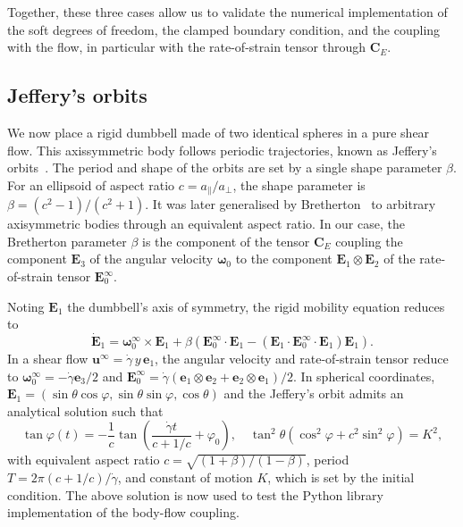\documentclass[aps,prfluids,groupedaddress]{revtex4-2}
\newcommand{\be}{\bm{e}}
\newcommand{\bu}{\bm{u}}
\newcommand{\bomega}{\bm{\omega}}
\newcommand{\bE}{\bm{E}}
\newcommand{\tC}{\bm{{C}}}
\newcommand{\tE}{\bm{{E}}}
\newcommand{\bEd}{\bm{{\dot E}}}
\begin{document}
Together, these three cases allow us to validate the numerical implementation of the soft degrees of freedom, the clamped boundary condition, and the coupling with the flow, in particular with the rate-of-strain tensor through $\tC_E$.

\subsection{Jeffery's orbits}

We now place a rigid dumbbell made of two identical spheres in a pure shear flow. 
This axissymmetric body follows periodic trajectories, known as Jeffery's orbits~\cite{Jeffery1922, Bretherton1962, Thorp2019, Ishimoto2023}. 
The period and shape of the orbits are set by a single shape parameter $\beta$. 
For an ellipsoid of aspect ratio $c=a_\parallel / a_\perp$, the shape parameter is $\beta = (c^2 - 1) / (c^2 + 1)$. 
It was later generalised by Bretherton~\cite{Bretherton1962} to arbitrary axisymmetric bodies through an equivalent aspect ratio.
In our case, the Bretherton parameter $\beta$ is the component of the tensor $\tC_E$ coupling the component $\bE_3$ of the angular velocity $\bomega_0$ to the component $\bE_1 \otimes \bE_2$ of the rate-of-strain tensor $\tE_0^\infty$. 

Noting $\bE_1$ the dumbbell's axis of symmetry, the rigid mobility equation reduces to
\begin{equation}
\bEd_1 = \bomega_0^\infty \times \bE_{1} +
	\beta\left(\tE_0^\infty\cdot\bE_{1} - (\bE_{1}\cdot\tE_0^\infty\cdot\bE_{1})\bE_{1}\right).
\end{equation}
In a shear flow $\bu^\infty = \dot\gamma\,y\,\be_1$, the angular velocity and rate-of-strain tensor reduce to $\bomega_0^\infty =- \dot\gamma\be_3/2 $ and $\tE_0^\infty = \dot\gamma(\be_1 \otimes \be_2 + \be_2 \otimes \be_1)/2$. 
In spherical coordinates, $\bE_{1} = (\sin\theta\cos\varphi,\sin\theta\sin\varphi,\cos\theta)$ and the Jeffery's orbit admits an analytical solution such that
\begin{equation}\label{eq:Jeffery_solution}
\tan\varphi(t) = -\frac{1}{c} \tan\left(\frac{\dot\gamma t}{c+1/c} + \varphi_0 \right), \quad
\tan^2\theta \left(\cos^2\varphi + c^2\sin^2\varphi \right)=K^2,
\end{equation}
with  equivalent aspect ratio $c=\sqrt{(1+\beta)/(1-\beta)}$, period $T=2\pi(c+1/c)/\dot\gamma$, and
 constant of motion $K$, which is set by the initial condition.  
The above solution is now used to test the Python library implementation of the body-flow coupling.
\end{document}
